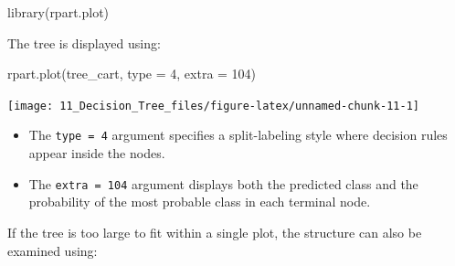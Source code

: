 \documentclass[
  11pt,
]{book}
\makeatletter
\newenvironment{Shaded}{}{}
\newcommand{\AttributeTok}[1]{#1}
\newcommand{\DecValTok}[1]{#1}
\newcommand{\FunctionTok}[1]{#1}
\newcommand{\NormalTok}[1]{#1}
\providecommand{\tightlist}{%
  \setlength{\itemsep}{0pt}\setlength{\parskip}{0pt}}
\newenvironment{kframe}{%
\medskip{}
\setlength{\fboxsep}{.8em}
 \def\at@end@of@kframe{}%
 \ifinner\ifhmode%
  \def\at@end@of@kframe{\end{minipage}}%
  \begin{minipage}{\columnwidth}%
 \fi\fi%
 \def\FrameCommand##1{\hskip\@totalleftmargin \hskip-\fboxsep
 \colorbox{shadecolor}{##1}\hskip-\fboxsep
     \hskip-\linewidth \hskip-\@totalleftmargin \hskip\columnwidth}%
 \MakeFramed {\advance\hsize-\width
   \@totalleftmargin\z@ \linewidth\hsize
   \@setminipage}}%
 {\par\unskip\endMakeFramed%
 \at@end@of@kframe}
\renewenvironment{Shaded}{\begin{kframe}}{\end{kframe}}
\theoremstyle{definition}
\theoremstyle{definition}
\theoremstyle{definition}
\theoremstyle{definition}
\theoremstyle{remark}
\makeatother
\begin{document}
\begin{Shaded}
\begin{Highlighting}[]
\FunctionTok{library}\NormalTok{(rpart.plot)}
\end{Highlighting}
\end{Shaded}

The tree is displayed using:

\begin{Shaded}
\begin{Highlighting}[]
\FunctionTok{rpart.plot}\NormalTok{(tree\_cart, }\AttributeTok{type =} \DecValTok{4}\NormalTok{, }\AttributeTok{extra =} \DecValTok{104}\NormalTok{)}
\end{Highlighting}
\end{Shaded}

\begin{center}\texttt{[image: 11\_Decision\_Tree\_files/figure-latex/unnamed-chunk-11-1]} \end{center}

\begin{itemize}
\tightlist
\item
  The \texttt{type\ =\ 4} argument specifies a split-labeling style where decision rules appear inside the nodes.
\item
  The \texttt{extra\ =\ 104} argument displays both the predicted class and the probability of the most probable class in each terminal node.
\end{itemize}

If the tree is too large to fit within a single plot, the structure can also be examined using:
\end{document}
